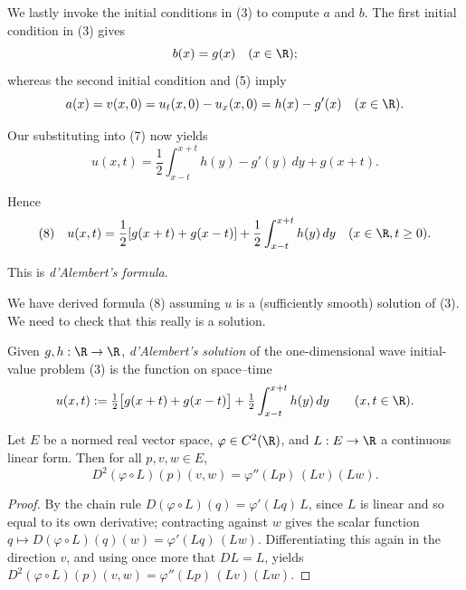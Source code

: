 We lastly invoke the initial conditions in (3) to compute $a$ and $b$. The first initial condition in (3) gives
$$b(x) = g(x) \quad (x \in \R);$$
whereas the second initial condition and (5) imply
$$a(x) = v(x,0) = u_t(x,0) - u_x(x,0) = h(x) - g'(x) \quad (x \in \R).$$

Our substituting into (7) now yields
$$u(x,t) = \frac{1}{2} \int_{x-t}^{x+t} h(y) - g'(y) \, dy + g(x+t).$$

Hence
$$(8) \quad u(x,t) = \frac{1}{2}[g(x+t) + g(x-t)] + \frac{1}{2} \int_{x-t}^{x+t} h(y) \, dy \quad (x \in \R, t \geq 0).$$

This is \textit{d'Alembert's formula}.

We have derived formula (8) assuming $u$ is a (sufficiently smooth) solution of (3). We need to check that this really is a solution.

\begin{definition}
\label{def:dalembert-formula}
\leanok
Given $g, h : \R \to \R$, \textit{d'Alembert's solution} of the one-dimensional
wave initial-value problem (3) is the function on space--time
$$u(x,t) := \tfrac12\bigl[g(x+t) + g(x-t)\bigr]
  + \tfrac12 \int_{x-t}^{x+t} h(y)\,dy \qquad (x, t \in \R).$$
\end{definition}

\begin{lemma}
\label{lem:second-order-chain-rule-linear-form}
\leanok
Let $E$ be a normed real vector space, $\varphi \in C^2(\R)$, and
$L : E \to \R$ a continuous linear form. Then for all $p, v, w \in E$,
$$D^2(\varphi \circ L)(p)(v,w) = \varphi''(Lp)\,(Lv)(Lw).$$
\end{lemma}
\begin{proof}
\leanok
By the chain rule $D(\varphi \circ L)(q) = \varphi'(Lq)\,L$, since $L$ is linear
and so equal to its own derivative; contracting against $w$ gives the scalar
function $q \mapsto D(\varphi \circ L)(q)(w) = \varphi'(Lq)\,(Lw)$. Differentiating
this again in the direction $v$, and using once more that $DL = L$, yields
$D^2(\varphi \circ L)(p)(v,w) = \varphi''(Lp)\,(Lv)(Lw)$.
\end{proof}

